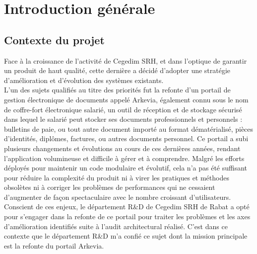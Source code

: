 {}
\noindent \section*{Introduction générale}

{}
\subsection*{Contexte du projet}
Face à la croissance de l'activité de Cegedim SRH, et dans l’optique de garantir un produit de haut qualité, cette dernière a décidé d’adopter une stratégie d’amélioration et d’évolution des systèmes existants.\\

L'un des sujets qualifiés au titre des priorités fut la refonte d'un portail de gestion électronique de documents appelé Arkevia, également connu sous le nom de coffre-fort électronique salarié, un outil de réception et de stockage sécurisé dans lequel le salarié peut stocker ses documents professionnels et personnels : bulletins de paie, ou tout autre document importé au format dématérialisé, pièces d'identités, diplômes, factures, ou autres documents personnel. Ce portail a subi plusieurs changements et évolutions au cours de ces dernières années, rendant l'application volumineuse et difficile à gérer et à comprendre. Malgré les efforts déployés pour maintenir un code modulaire et évolutif, cela n'a pas été suffisant pour réduire la complexité du produit ni à virer les pratiques et méthodes obsolètes ni à corriger les problèmes de performances qui ne cessaient d'augmenter de façon spectaculaire avec le nombre croissant d'utilisateurs.\\

Conscient de ces enjeux, le département R\&D de Cegedim SRH de Rabat a opté pour s'engager dans la refonte de ce portail pour traiter les problèmes et les axes d’amélioration identifiés suite à l’audit architectural réalisé. C'est dans ce contexte que le département R\&D m'a confié ce sujet dont la mission principale est la refonte du portail Arkevia.
